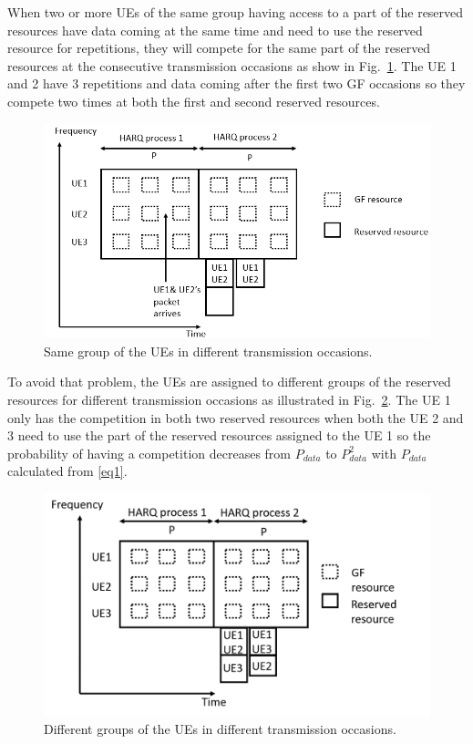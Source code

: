 \documentclass[conference]{IEEEtran}
\begin{document}
When two or more UEs of the same group having access to a part of the reserved resources have data coming at the same time and need to use the reserved resource for repetitions, they will compete for the same part of the reserved resources at the consecutive transmission occasions as show in Fig.~\ref{fig5}. The UE 1 and 2 have 3 repetitions and data coming after the first two GF occasions so they compete two times at both the first and second reserved resources.

\begin{figure}[htbp]
\centerline{\includegraphics[scale=0.32]{fig5.png}}
\caption{Same group of the UEs in different transmission occasions.}
\label{fig5}
\end{figure}

To avoid that problem, the UEs are assigned to different groups of the reserved resources for different transmission occasions as illustrated in Fig.~\ref{fig6}. The UE 1 only has the competition in both two reserved resources when both the UE 2 and 3 need to use the part of the reserved resources assigned to the UE 1 so the probability of having a competition decreases from $P_{data}$ to $P_{data}^2$ with $P_{data}$ calculated from \eqref{eq1}.

\begin{figure}[htbp]
\centerline{\includegraphics[scale=0.32]{fig6.png}}
\caption{Different groups of the UEs in different transmission occasions.}
\label{fig6}
\end{figure}
\end{document}
